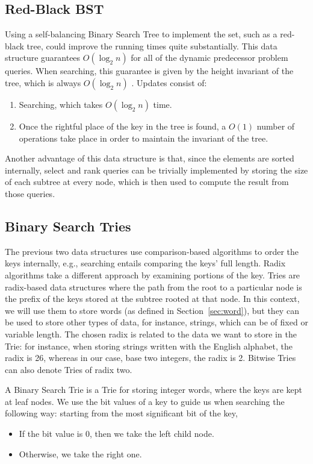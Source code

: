 \subsection{Red-Black BST}

Using a self-balancing Binary Search Tree to implement the set, such as a red-black tree, could improve the running times quite substantially.
This data structure guarantees $O(\log_2 n)$ for all of the dynamic predecessor problem queries.
When searching, this guarantee is given by the height invariant of the tree, which is always $O(\log_2 n)$ \cite{cormen2009introduction}.
Updates consist of:
\begin{enumerate}
    \item
    Searching, which takes $O(\log_2 n)$ time.
    
    \item
    Once the rightful place of the key in the tree is found, a $O(1)$ number of operations take place in order to maintain the invariant of the tree. 
\end{enumerate}

Another advantage of this data structure is that, since the elements are sorted internally, select and rank queries can be trivially implemented by storing the size of each subtree at every node, which is then used to compute the result from those queries.

\subsection{Binary Search Tries}

The previous two data structures use comparison-based algorithms to order the keys internally, e.g., searching entails comparing the keys' full length.
Radix algorithms take a different approach by examining portions of the key.
Tries are radix-based data structures where the path from the root to a particular node is the prefix of the keys stored at the subtree rooted at that node.
In this context, we will use them to store words (as defined in Section~\ref{sec:word}), but they can be used to store other types of data, for instance, strings, which can be of fixed or variable length.
The chosen radix is related to the data we want to store in the Trie: for instance, when storing strings written with the English alphabet, the radix is 26, whereas in our case, base two integers, the radix is 2. Bitwise Tries can also denote Tries of radix two.

A Binary Search Trie is a Trie for storing integer words, where the keys are kept at leaf nodes. We use the bit values of a key to guide us when searching the following way: starting from the most significant bit of the key,
\begin{itemize}
    \item
    If the bit value is $0$, then we take the left child node.
    \item 
    Otherwise, we take the right one.
\end{itemize}

